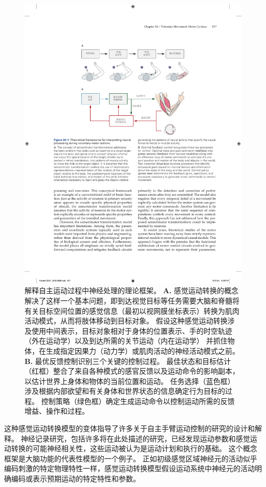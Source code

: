 \begin{figure}[htbp]
	\centering
	\includegraphics[width=0.87\linewidth]{chap34/fig_34_1}
	\caption{解释自主运动过程中神经处理的理论框架。
		\textbf{A.} 感觉运动转换的概念解决了这样一个基本问题，即到达视觉目标等任务需要大脑和脊髓将有关目标空间位置的感觉信息（最初以视网膜坐标表示）转换为肌肉活动模式，从而将肢体移动到目标对象。 
		假设这种感觉运动转换涉及使用中间表示，目标对象相对于身体的位置表示、手的时空轨迹（外在运动学）以及到达所需的关节运动（内在运动学） 并抓住物体，在生成指定因果力（动力学）或肌肉活动的神经活动模式之前。 
		\textbf{B.} 最优反馈控制识别三个关键的控制过程。 
		最佳状态和目标估计（红框）整合了来自各种模式的感官反馈以及运动命令的影响副本，以估计世界上身体和物体的当前位置和运动。
		任务选择（蓝色框）涉及根据内部欲望和有关身体和世界状态的信息确定行为目标的过程。
		控制策略（绿色框）确定生成运动命令以控制运动所需的反馈增益、操作和过程。}
	\label{fig:34_1}
\end{figure}


这种感觉运动转换模型的变体指导了许多关于自主手臂运动控制的研究的设计和解释。
神经记录研究，包括许多将在此处描述的研究，已经发现运动参数和感觉运动转换的可能神经相关性，这些运动被认为是运动计划和执行的基础。
这个概念框架是大脑功能的代表性模型的一个例子。
正如初级感觉区域神经元的活动似乎编码刺激的特定物理特性一样，感觉运动转换模型假设运动系统中神经元的活动明确编码或表示预期运动的特定特性和参数。


